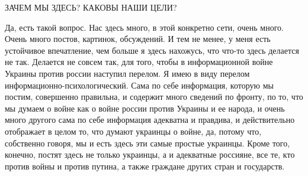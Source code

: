  
 
 
 
 

ЗАЧЕМ МЫ ЗДЕСЬ? КАКОВЫ НАШИ ЦЕЛИ?

Да, есть такой вопрос. Нас здесь много, в этой конкретно сети, очень много.
Очень много постов, картинок, обсуждений. И тем не менее, у меня есть
устойчивое впечатление, чем больше я здесь нахожусь, что что-то здесь делается
не так. Делается не совсем так, для того, чтобы в информационной войне Украины
против россии наступил перелом.  Я имею в виду перелом
информационно-психологический. Сама по себе информация, которую мы постим,
совершенно правильна, и содержит много сведений по фронту, по то, что мы думаем
о войне как о войне россии против Украины и ее народа, и очень много другого
сама по себе информация адекватна и правдива, и действительно отображает в
целом то, что думают украинцы о войне, да, потому что, собственно говоря, мы и
есть здесь эти самые простые украинцы. Кроме того, конечно, постят здесь не
только украинцы, а и адекватные россияне, все те, кто против войны и против
путина, а также граждане других стран и государств.

